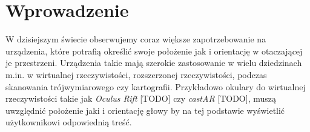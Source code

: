 
\chapter*{Wprowadzenie}

W dzisiejszym świecie obserwujemy coraz większe zapotrzebowanie na urządzenia,
które potrafią określić swoje położenie jak i orientację w otaczającej je przestrzeni.
Urządzenia takie mają szerokie zastosowanie w wielu dziedzinach m.in. w
wirtualnej rzeczywistości, rozszerzonej rzeczywistości, 
 podczas skanowania trójwymiarowego czy kartografii.
Przykładowo okulary do wirtualnej rzeczywistości takie jak \textit{Oculus Rift} [TODO] czy \textit{castAR} [TODO],
muszą uwzględnić położenie jaki i orientację głowy by na tej podstawie wyświetlić użytkownikowi 
odpowiednią treść. 


